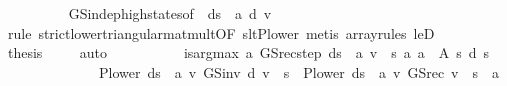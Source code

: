\begin{isabellebody}
\ \ \ \ \ \ \ \ \isamarkupfalse%
\ GS{\isacharunderscore}{\kern0pt}indep{\isacharunderscore}{\kern0pt}high{\isacharunderscore}{\kern0pt}states{\isacharbrackleft}{\kern0pt}of\ {\isacharunderscore}{\kern0pt}\ {\isachardoublequoteopen}d{\isacharparenleft}{\kern0pt}s\ {\isacharcolon}{\kern0pt}{\isacharequal}{\kern0pt}\ a{\isacharparenright}{\kern0pt}{\isachardoublequoteclose}\ d\ v{\isacharbrackright}{\kern0pt}\isanewline
\ \ \ \ \ \ \ \ \isamarkupfalse%
\ {\isacharparenleft}{\kern0pt}rule\ strict{\isacharunderscore}{\kern0pt}lower{\isacharunderscore}{\kern0pt}triangular{\isacharunderscore}{\kern0pt}mat{\isacharunderscore}{\kern0pt}mult{\isacharbrackleft}{\kern0pt}OF\ slt{\isacharunderscore}{\kern0pt}P{\isacharunderscore}{\kern0pt}lower{\isacharbrackright}{\kern0pt}{\isacharparenright}{\kern0pt}\ {\isacharparenleft}{\kern0pt}metis\ array{\isacharunderscore}{\kern0pt}rules{\isacharparenleft}{\kern0pt}{}{\isacharparenright}{\kern0pt}\ leD{\isacharparenright}{\kern0pt}\isanewline
\ \ \ \ \ \ \isamarkupfalse%
\ {\isacharquery}{\kern0pt}thesis\ \isamarkupfalse%
\ {\isacharasterisk}{\kern0pt}\ \isamarkupfalse%
\ auto\isanewline
\ \ \ \ \isamarkupfalse%
\isanewline
\ \ \ \ \isamarkupfalse%
\ {\isachardoublequoteopen}is{\isacharunderscore}{\kern0pt}arg{\isacharunderscore}{\kern0pt}max\ {\isacharparenleft}{\kern0pt}{\isasymlambda}a{\isachardot}{\kern0pt}\ GS{\isacharunderscore}{\kern0pt}rec{\isacharunderscore}{\kern0pt}step\ {\isacharparenleft}{\kern0pt}d{\isacharparenleft}{\kern0pt}s\ {\isacharcolon}{\kern0pt}{\isacharequal}{\kern0pt}\ a{\isacharparenright}{\kern0pt}{\isacharparenright}{\kern0pt}\ v\ {\isachardollar}{\kern0pt}\ s{\isacharparenright}{\kern0pt}\ {\isacharparenleft}{\kern0pt}{\isasymlambda}a{\isachardot}{\kern0pt}\ a\ {\isasymin}\ A\ s{\isacharparenright}{\kern0pt}\ {\isacharparenleft}{\kern0pt}d\ s{\isacharparenright}{\kern0pt}{\isachardoublequoteclose}\isanewline
\ \ \ \ \isamarkupfalse%
\ {\isacharminus}{\kern0pt}\isanewline
\ \ \ \ \ \ \isamarkupfalse%
\ {\isachardoublequoteopen}{\isacharparenleft}{\kern0pt}P{\isacharunderscore}{\kern0pt}lower\ {\isacharparenleft}{\kern0pt}d{\isacharparenleft}{\kern0pt}s\ {\isacharcolon}{\kern0pt}{\isacharequal}{\kern0pt}\ a{\isacharparenright}{\kern0pt}{\isacharparenright}{\kern0pt}\ {\isacharasterisk}{\kern0pt}v\ {\isacharparenleft}{\kern0pt}GS{\isacharunderscore}{\kern0pt}inv\ d\ v{\isacharparenright}{\kern0pt}{\isacharparenright}{\kern0pt}\ {\isachardollar}{\kern0pt}\ s\ {\isacharequal}{\kern0pt}\ {\isacharparenleft}{\kern0pt}P{\isacharunderscore}{\kern0pt}lower\ {\isacharparenleft}{\kern0pt}d{\isacharparenleft}{\kern0pt}s\ {\isacharcolon}{\kern0pt}{\isacharequal}{\kern0pt}\ a{\isacharparenright}{\kern0pt}{\isacharparenright}{\kern0pt}\ {\isacharasterisk}{\kern0pt}v\ {\isacharparenleft}{\kern0pt}GS{\isacharunderscore}{\kern0pt}rec\ v{\isacharparenright}{\kern0pt}{\isacharparenright}{\kern0pt}\ {\isachardollar}{\kern0pt}\ s{\isachardoublequoteclose}\ \ a\isanewline

\end{isabellebody}
